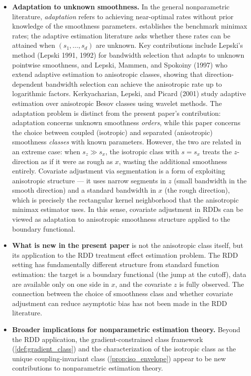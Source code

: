 \begin{itemize}
	\item \textbf{Adaptation to unknown smoothness.}
	In the general nonparametric literature, \emph{adaptation} refers to achieving near-optimal rates without prior knowledge of the smoothness parameters.
	\textcite{stone_optimal_1980} establishes the benchmark minimax rates; the adaptive estimation literature asks whether these rates can be attained when $(s_1, \ldots, s_d)$ are unknown.
	Key contributions include Lepski's method (Lepski 1991, 1992) for bandwidth selection that adapts to unknown pointwise smoothness, and Lepski, Mammen, and Spokoiny (1997) who extend adaptive estimation to anisotropic classes, showing that direction-dependent bandwidth selection can achieve the anisotropic rate up to logarithmic factors.
	Kerkyacharian, Lepski, and Picard (2001) study adaptive estimation over anisotropic Besov classes using wavelet methods.
	The adaptation problem is distinct from the present paper's contribution: adaptation concerns unknown smoothness \emph{orders}, while this paper concerns the choice between coupled (isotropic) and separated (anisotropic) smoothness \emph{classes} with known parameters.
	However, the two are related in an extreme case: when $s_z \gg s_x$, the isotropic class with $s = s_x$ treats the $z$-direction as if it were as rough as $x$, wasting the additional smoothness entirely.
	Covariate adjustment via segmentation is a form of exploiting anisotropic structure --- it uses narrow segments in $z$ (small bandwidth in the smooth direction) and a standard bandwidth in $x$ (the rough direction), which is precisely the rectangular kernel neighborhood that the anisotropic minimax estimator uses.
	In this sense, covariate adjustment in RDDs can be viewed as adaptation to anisotropic smoothness structure applied to the boundary functional.
	\item \textbf{What is new in the present paper} is not the anisotropic class itself, but its application to the RDD treatment effect estimation problem.
	The RDD setting has fundamentally different structure from standard function estimation: the target is a boundary functional (the jump at the cutoff), data are available only on one side in $x$, and the covariate $z$ is fully observed.
	The connection between the choice of smoothness class and whether covariate adjustment can reduce asymptotic bias has not been made in the RDD literature.
	\item \textbf{Broader implications for nonparametric estimation theory.}
	Beyond the RDD application, the gradient-constrained class framework (\cref{def:gradient_class}) and the characterization of the isotropic class as the unique coupling-invariant class (\cref{prop:iso_envelope}) appear to be new contributions to nonparametric estimation theory.

\end{itemize}
